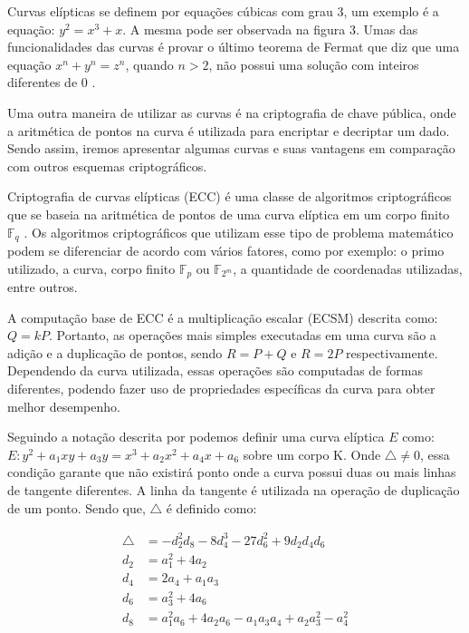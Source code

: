 Curvas elípticas se definem por equações cúbicas com grau 3, um exemplo é a equação: $y^2 = x^3 + x$. A mesma pode ser observada na figura 3. Umas das funcionalidades das curvas é provar o último teorema de Fermat que diz que uma equação $x^n + y^n = z^n$, quando $n > 2$, não possui uma solução com inteiros diferentes de $0$ \cite{Hankerson:2003:GEC:940321}.

Uma outra maneira de utilizar as curvas é na criptografia de chave pública, onde a aritmética de pontos na curva é utilizada para encriptar e decriptar um dado. Sendo assim, iremos apresentar algumas curvas e suas vantagens em comparação com outros esquemas criptográficos.

Criptografia de curvas elípticas (ECC) é uma classe de algoritmos criptográficos que se baseia na aritmética de pontos de uma curva elíptica em um corpo finito $\mathbb{F}_q$ \cite{Hankerson:2003:GEC:940321}. Os algoritmos criptográficos que utilizam esse tipo de problema matemático podem se diferenciar de acordo com vários fatores, como por exemplo: o primo utilizado, a curva, corpo finito $\mathbb{F}_p$ ou $\mathbb{F}_{2^m}$, a quantidade de coordenadas utilizadas, entre outros.

A computação base de ECC é a multiplicação escalar (ECSM) descrita como: $Q = kP$. Portanto, as operações mais simples executadas em uma curva são a adição e a duplicação de pontos, sendo $R = P + Q$ e $R = 2P$ respectivamente. Dependendo da curva utilizada, essas operações são computadas de formas diferentes, podendo fazer uso de propriedades específicas da curva para obter melhor desempenho.

Seguindo a notação descrita por \cite{Hankerson:2003:GEC:940321} podemos definir uma curva elíptica $E$ como: $E: y^2 + a_1xy + a_3y = x^3 + a_2x^2 + a_4x + a_6$ sobre um corpo K. Onde $\bigtriangleup \neq 0$, essa condição garante que não existirá ponto onde a curva possui duas ou mais linhas de tangente diferentes. A linha da tangente é utilizada na operação de duplicação de um ponto. Sendo que, $\bigtriangleup$ é definido como:

\begin{align*}
\bigtriangleup &= -d_2^2d_8 - 8d_4^3 - 27d_6^2 + 9d_2d_4d_6 \\
d_2 &= a_1^2 + 4a_2 \\
d_4 &= 2a_4 + a_1a_3 \\ 
d_6 &= a_3^2 + 4a_6 \\
d_8 &= a_1^2a_6 + 4a_2a_6 - a_1a_3a_4 + a_2a_3^2 - a_4^2
\end{align*}

